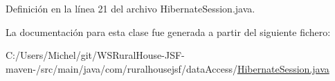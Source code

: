 Definición en la línea 21 del archivo Hibernate\+Session.\+java.



La documentación para esta clase fue generada a partir del siguiente fichero\+:\begin{DoxyCompactItemize}
\item 
C\+:/\+Users/\+Michel/git/\+W\+S\+Rural\+House-\/\+J\+S\+F-\/maven-\//src/main/java/com/ruralhousejsf/data\+Access/\mbox{\hyperlink{_hibernate_session_8java}{Hibernate\+Session.\+java}}\end{DoxyCompactItemize}
